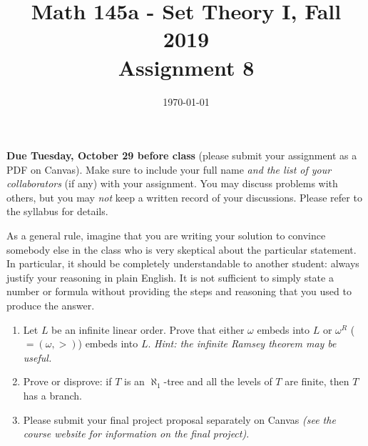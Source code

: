 \documentclass{amsart}
\title[Math 145a, Fall 2019: assignment 8]{Math 145a - Set Theory I, Fall 2019 \\ Assignment 8}
\date{\today}
\theoremstyle{definition}
\begin{document}

\vspace*{-10em}

\maketitle

\textbf{Due Tuesday, October 29 before class} (please submit your assignment as a PDF on Canvas). Make sure to include your full name \emph{and the list of your collaborators} (if any) with your assignment. You may discuss problems with others, but you may \emph{not} keep a written record of your discussions. Please refer to the syllabus for details.

As a general rule, imagine that you are writing your solution to convince somebody else in the class who is very skeptical about the particular statement. In particular, it should be completely understandable to another student: always justify your reasoning in plain English. It is not sufficient to simply state a number or formula without providing the steps and reasoning that you used to produce the answer.

\begin{enumerate}
\item Let $L$ be an infinite linear order. Prove that either $\omega$ embeds into $L$ or $\omega^R$ ($= (\omega, >)$) embeds into $L$. \emph{Hint: the infinite Ramsey theorem may be useful.}
\item Prove or disprove: if $T$ is an $\aleph_1$-tree and all the levels of $T$ are finite, then $T$ has a branch.
\item Please submit your final project proposal separately on Canvas \emph{(see the course website for information on the final project)}.
\end{enumerate}
\end{document}
